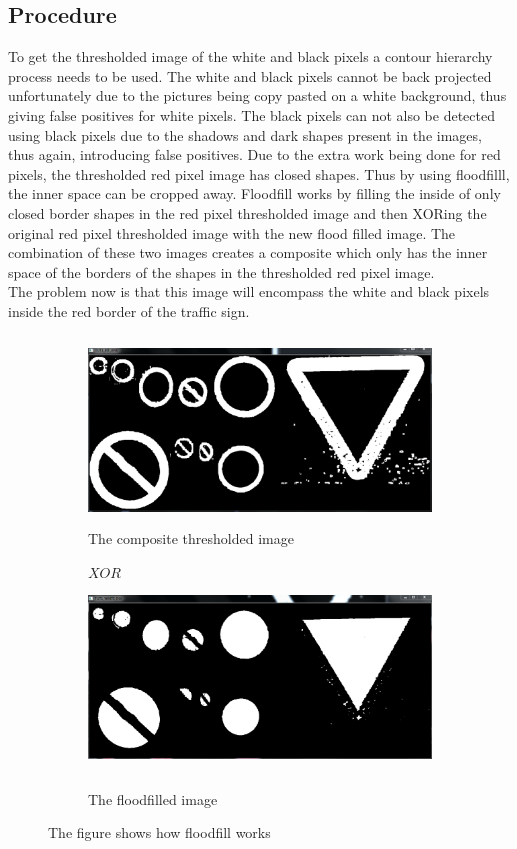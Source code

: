 \documentclass{article}
\begin{document}
\subsection{Procedure}\label{sec:intro}
To get the thresholded image of the white and black pixels a contour hierarchy process needs to be used. The white and black pixels cannot be back projected unfortunately due to the pictures being copy pasted on a white background, thus giving false positives for white pixels. The black pixels can not also be detected using black pixels due to the shadows and dark shapes present in the images, thus again, introducing false positives.
Due to the extra work being done for red pixels, the thresholded red pixel image has closed shapes. Thus by using floodfilll, the inner space can be cropped away. Floodfill works by filling the inside of only closed border shapes in the red pixel thresholded image and then XORing the original red pixel thresholded image with the new flood filled image. The combination of these two images creates a composite which only has the inner space of the borders of the shapes in the thresholded red pixel image.\\
The problem now is that this image will encompass the white and black pixels inside the red border of the traffic sign. \\
\begin{figure}[H]
\begin{subfigure}{0.5\textwidth}
\includegraphics[width=0.9\linewidth, height=5cm]{N_BIT_AND.PNG} 
\caption{The composite thresholded image}
\label{fig:subim1}
\end{subfigure}
\begin{subfigure}{0.5\textwidth}
$XOR   $
\includegraphics[width=0.9\linewidth, height=5cm]{N_WHITE_INV.PNG}
\caption{The floodfilled image}
\label{fig:subim2}
\end{subfigure}
\caption{The figure shows how floodfill works}
\label{fig:image2}
\end{figure}
\end{document}
